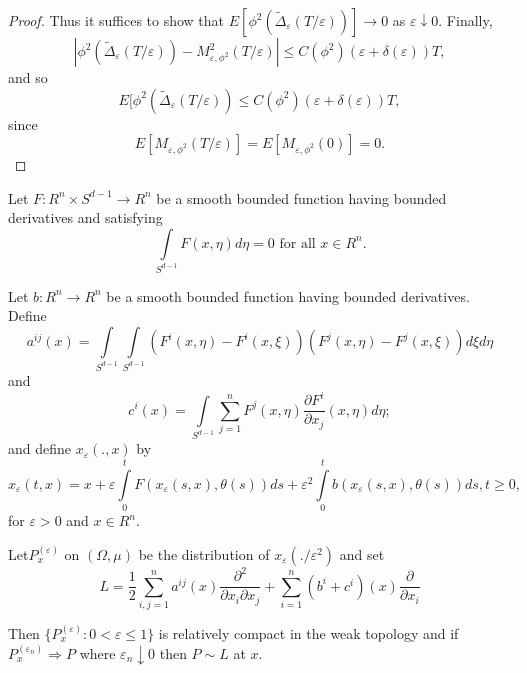 \begin{proof}
Thus it suffices to show that  $E[\phi^2 (\tilde{\Delta}_\varepsilon(T/
  \varepsilon))] \rightarrow 0$ as $\varepsilon \downarrow 0$. Finally,  
$$
|\phi^2 (\tilde{\Delta}_\varepsilon (T/ \varepsilon)) -
M^2_{\varepsilon , \phi^2}(T/ \varepsilon) | \le C(\phi^2)
(\varepsilon + \delta(\varepsilon ))T, 
$$
and so  
$$
E[\phi^2 (\tilde{\Delta}_\varepsilon (T/ \varepsilon)) \le C(\phi^2)
  (\varepsilon +  \delta(\varepsilon)) T, 
$$
since  
$$
E[M_{\varepsilon , \phi^2}(T/ \varepsilon)] = E[M_{\varepsilon ,
    \phi^2}(0)] = 0. 
$$
\end{proof}

\setcounter{theorem}{9}
\begin{theorem}\label{chap2:thm2.10}%
Let $F : R^n \times S^{d-1} \rightarrow R^n$ be a smooth bounded
function having bounded derivatives and satisfying  
$$ 
\int \limits_{S^{d-1}} F(x, \eta)d \eta = 0  \text { for  all } x
\in R^n. 
$$

Let $b : R^n \rightarrow R^n$ be a smooth bounded function having
bounded derivatives. Define 
$$
a^{ij}(x) = \int \limits_{S^{d-1}}\int \limits_{S^{d-1}} (F^i (x,
\eta) - F^i (x, \xi)) (F^j (x, \eta) - F^j(x, \xi)) d\xi d \eta 
$$
and 
$$
c^i(x) = \int \limits_{S^{d-1}} \sum^n_{j=1} F^j(x, \eta)
\frac{\partial F^i}{\partial x_j} (x, \eta)d \eta; 
$$
and define $x_\varepsilon (.,x)$ by 
$$
x_\varepsilon (t,x) = x + \varepsilon \int \limits^t_0 F
(x_\varepsilon (s,x), \theta(s))ds + \varepsilon^2 \int \limits^t_0 b
(x_\varepsilon (s,x), \theta(s))ds, t \ge 0, 
$$
for $\varepsilon > 0$ and $x\in R^n$. 

Let\pageoriginale $P^{(\varepsilon)}_x$ on $(\Omega, \mu)$ be the
distribution of $x_\varepsilon (./ \varepsilon^2)$ and set   
$$
L = \frac{1}{2} \sum^n_{i,j=1} a^{ij}(x) \frac{\partial^2}{\partial
  x_i \partial x_j} + \sum^n_{i =1} (b^i + c^i)(x)
\frac{\partial}{\partial x_i} 
$$

Then $\{ P^{(\varepsilon)}_{x} : 0 < \varepsilon \le 1 \}$ is relatively
compact in the weak topology and if $P^{(\varepsilon_n)}_x \Rightarrow P$ where
$\varepsilon_n \downarrow 0$ then $P \sim L $ at $x$. 
\end{theorem}


